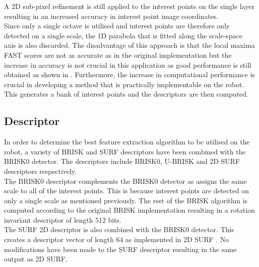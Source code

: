 \documentclass{report}
\begin{document}

A 2D sub-pixel refinement is still applied to the interest points on the single layer resulting in an increased accuracy in interest point image coordinates.\\

Since only a single octave is utilised and interest points are therefore only detected on a single scale, the 1D parabola that is fitted along the scale-space axis \cite{Leutenegger2011} is also discarded. The disadvantage of this approach is that the local maxima FAST scores are not as accurate as in the original implementation but the increase in accuracy is not crucial in this application as good performance is still obtained as shown in . Furthermore, the increase in computational performance is crucial in developing a method that is practically implementable on the robot. This generates a bank of interest points and the descriptors are then computed.\\

\subsection{Descriptor}
\label{sec:BRISK0Describe}
In order to determine the best feature extraction algorithm to be utilised on the robot, a variety of BRISK and SURF descriptors have been combined with the BRISK0 detector. The descriptors include BRISK0, U-BRISK and 2D SURF descriptors respectively.\\

The BRISK0 descriptor complements the BRISK0 detector as assigns the same scale to all of the interest points. This is because interest points are detected on only a single scale as mentioned previously. The rest of the BRISK algorithm is computed according to the original BRISK implementation resulting in a rotation invariant descriptor of length $512$ bits\cite{Leutenegger2011}.\\

The SURF 2D descriptor is also combined with the BRISK0 detector. This creates a descriptor vector of length $64$ as implemented in 2D SURF \cite{Bay}. No modifications have been made to the SURF descriptor resulting in the same output as 2D SURF.\\ 
\end{document}
